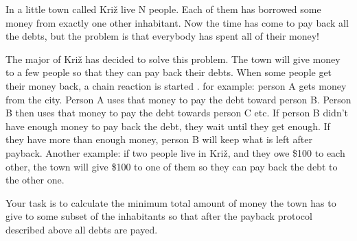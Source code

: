 In a little town called Križ live N people. Each of them has borrowed some money from exactly one other inhabitant. Now the time has come to pay back all the debts, but the problem is that everybody  has spent all of their money!  

   The major of Križ has decided to solve this problem. The town will give money to a few people so that  they can pay back their debts. When some people get their money back, a chain reaction is started . for  example: person A gets money from the city. Person A uses that money to pay the debt toward person  B. Person B then uses that money to pay the debt towards person C etc. If person B didn’t have  enough money to pay back the debt, they wait until  they get enough. If they have more than enough  money, person B will keep what is left after payback.   Another example: if two people live in Križ, and they owe \$100 to each other, the town will give \$100  to one of them so they can pay back the debt to the other one.  

   Your task is to calculate the minimum total amount of money the town has to give to some subset  of the inhabitants so that after the payback protocol described above all debts are payed.